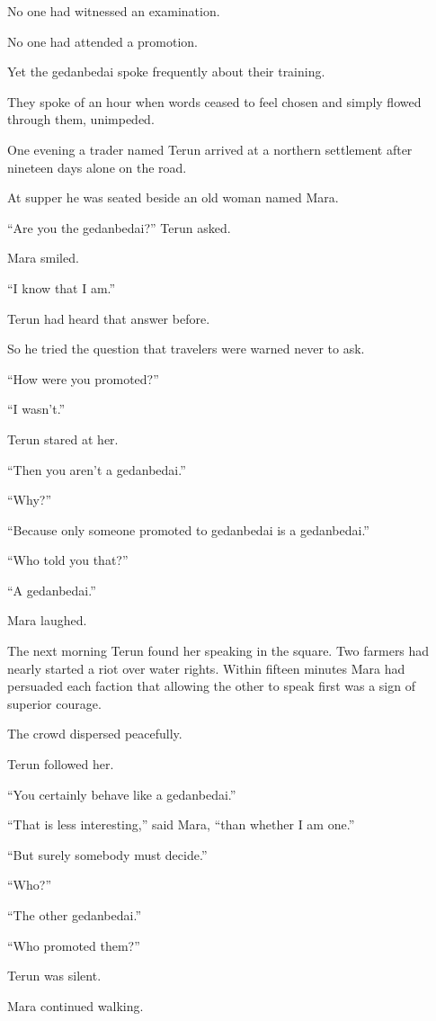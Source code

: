 \documentclass[11pt]{article}
\begin{document}
No one had witnessed an examination.

No one had attended a promotion.

Yet the gedanbedai spoke frequently about their training.

They spoke of an hour when words ceased to feel chosen and simply flowed through them, unimpeded.

One evening a trader named Terun arrived at a northern settlement after nineteen days alone on the road.

At supper he was seated beside an old woman named Mara.

``Are you the gedanbedai?'' Terun asked.

Mara smiled.

``I know that I am.''

Terun had heard that answer before.

So he tried the question that travelers were warned never to ask.

``How were you promoted?''

``I wasn't.''

Terun stared at her.

``Then you aren't a gedanbedai.''

``Why?''

``Because only someone promoted to gedanbedai is a gedanbedai.''

``Who told you that?''

``A gedanbedai.''

Mara laughed.

The next morning Terun found her speaking in the square. Two farmers had nearly started a riot over water rights. Within fifteen minutes Mara had persuaded each faction that allowing the other to speak first was a sign of superior courage.

The crowd dispersed peacefully.

Terun followed her.

``You certainly behave like a gedanbedai.''

``That is less interesting,'' said Mara, ``than whether I am one.''

``But surely somebody must decide.''

``Who?''

``The other gedanbedai.''

``Who promoted them?''

Terun was silent.

Mara continued walking.
\end{document}
